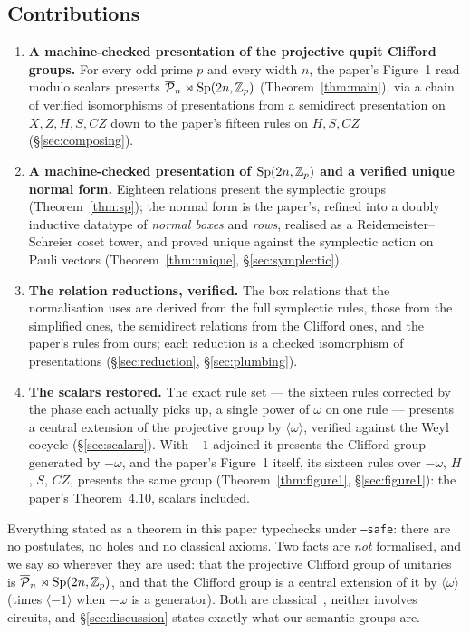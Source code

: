 \subsection{Contributions}\label{sec:contributions}

\begin{enumerate}
\item[(1)] \textbf{A machine-checked presentation of the projective
  qupit Clifford groups.}  For every odd prime $p$ and every width $n$,
  the paper's Figure~1 read modulo scalars presents
  $\overline{\mathcal{P}}_{n} \rtimes \mathrm{Sp}(2n,\mathbb{Z}_p)$ (Theorem~\ref{thm:main}), via a chain of
  verified isomorphisms of presentations from a semidirect presentation
  on $X, Z, H, S, CZ$ down to the paper's fifteen rules on $H, S, CZ$
  (\S\ref{sec:composing}).
\item[(2)] \textbf{A machine-checked presentation of $\mathrm{Sp}(2n,\mathbb{Z}_p)$ and a
  verified unique normal form.}  Eighteen relations present the
  symplectic groups (Theorem~\ref{thm:sp}); the normal form is the
  paper's, refined into a doubly inductive datatype of \emph{normal boxes} and \emph{rows},
  realised as a Reidemeister--Schreier coset tower, and proved unique
  against the symplectic action on Pauli vectors
  (Theorem~\ref{thm:unique}, \S\ref{sec:symplectic}).
\item[(3)] \textbf{The relation reductions, verified.}  The box
  relations that the normalisation uses are derived from the full
  symplectic rules, those from the simplified ones, the semidirect
  relations from the Clifford ones, and the paper's rules from ours;
  each reduction is a checked isomorphism of presentations
  (\S\ref{sec:reduction}, \S\ref{sec:plumbing}).
\item[(4)] \textbf{The scalars restored.}  The exact rule set --- the
  sixteen rules corrected by the phase each actually picks up, a single
  power of $\omega$ on one rule --- presents a central extension of the
  projective group by $\langle\omega\rangle$, verified against the Weyl
  cocycle (\S\ref{sec:scalars}).  With $-1$ adjoined it presents the
  Clifford group generated by $-\omega$, and the paper's Figure~1
  itself, its sixteen rules over $-\omega$, $H$, $S$, $CZ$, presents the
  same group (Theorem~\ref{thm:figure1}, \S\ref{sec:figure1}): the
  paper's Theorem~4.10, scalars included.
\end{enumerate}

Everything stated as a theorem in this paper typechecks under
\texttt{--safe}: there are no postulates, no holes and no classical
axioms.  Two facts are \emph{not} formalised, and we say so wherever
they are used: that the projective Clifford group of unitaries is
$\overline{\mathcal{P}}_{n} \rtimes \mathrm{Sp}(2n,\mathbb{Z}_p)$, and that the Clifford group is a central
extension of it by $\langle\omega\rangle$ (times $\langle -1\rangle$
when $-\omega$ is a generator).  Both are
classical~\cite{bian2026qudit}, neither involves circuits, and
\S\ref{sec:discussion} states exactly what our semantic groups are.

